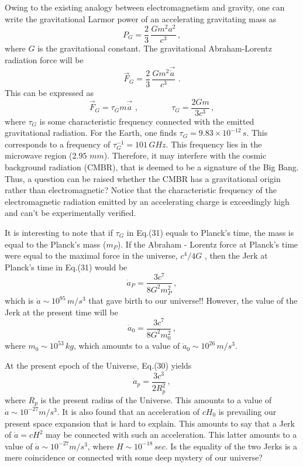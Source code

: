 \documentclass[a4]{epl2}
\begin{document}
Owing to the existing analogy between electromagnetism and gravity, one can write the gravitational Larmor power of an accelerating gravitating mass as \textcolor[rgb]{0.00,0.07,1.00}{\cite{gravitomagnetism}}
\begin{equation}
P_G=\frac{2}{3}\, \frac{Gm^2a^2}{c^3}\,,
\end{equation}
where $G$ is the gravitational constant. The gravitational Abraham-Lorentz radiation force will be
\begin{equation}
\vec{F}_G=\frac{2}{3}\, \frac{Gm^2\vec{\dot a}}{c^3}\,\,.
\end{equation}
This can be expressed as
\begin{equation}
\vec{F}_G=\tau_Gm\vec{\dot a}\,\,,\qquad\qquad \tau_G=\frac{2Gm}{3c^3}\,,
\end{equation}
where  $\tau_G$ is some characteristic frequency connected with the emitted gravitational radiation.
For the Earth, one finds $\tau_G=9.83\times 10^{-12}\, s$. This corresponds to a frequency of $\tau_G^{-1}=101\, GHz$. This frequency lies   in the microwave region ($2.95\,\, mm$). Therefore, it may interfere with the cosmic background radiation (CMBR), that is deemed to be a signature of the Big Bang. Thus, a question can be raised whether the CMBR has a gravitational origin rather than electromagnetic? Notice that the characteristic frequency of the electromagnetic radiation emitted by an accelerating charge is exceedingly high and can't be experimentally verified.

It is interesting to note that if $\tau_G$ in Eq.(31) equals to Planck's time, the mass is equal to the Planck's mass ($m_P$). If the Abraham - Lorentz force at Planck's time were equal to the maximal force in the universe, $c^4/4G$ \textcolor[rgb]{0.00,0.07,1.00}{\cite{maximal,maximal1}}, then the Jerk at Planck's time in Eq.(31) would be
\begin{equation}
\dot a_P=\frac{3c^7}{8G^2m_P^2}\,,
\end{equation}
which is  $\dot a\sim 10^{95}\,m/s^3$ that gave birth to our universe!!  However, the value of the Jerk at the present time will be
\begin{equation}
\dot a_0=\frac{3c^7}{8G^2m_0^2}\,,
\end{equation}
where $m_0\sim 10^{53}\, kg$, which amounts to a value of $\dot a_0\sim 10^{26}\, m/s^3$.

At the present epoch of the Universe, Eq.(30) yields
\begin{equation}
\dot a_p=\frac{3c^3}{2R_p^2}\,,
\end{equation}
where $R_p$ is the present radius of the Universe. This amounts to a value of $\dot a\sim 10^{-27} m/s^3$. It is also found that an acceleration of $cH_0$ is prevailing our present space expansion that is hard to explain. This amounts to say that a Jerk of $\dot a=cH^2$ may be connected with such an acceleration. This latter amounts to a value of $\dot a\sim 10^{-27}m/s^3$, where $H\sim 10^{-18}\, sec$. Is the equality of the two Jerks is  a mere coincidence or connected with some deep mystery of  our universe?
\end{document}
